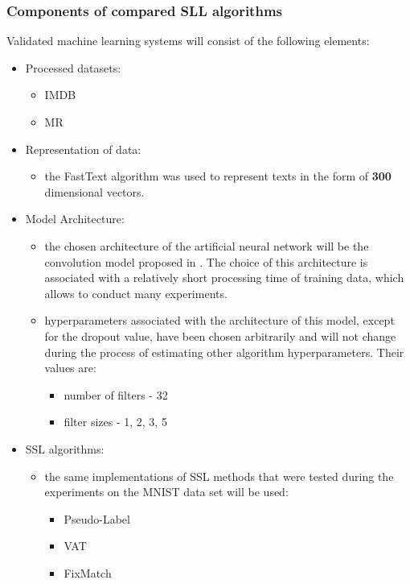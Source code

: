 \documentclass[12pt]{article}
\theoremstyle{definition}
\DeclareRobustCommand{\[}{\begin{equation}}
\DeclareRobustCommand{\]}{\end{equation}}
\begin{document}
\subsubsection{Components of compared SLL algorithms}
Validated machine learning systems will consist of the following elements:
\begin{itemize}
   \item Processed datasets:
   \begin{itemize}
     \item  IMDB \cite{IMDB}
     \item  MR \cite{MR}
   \end{itemize}
   \item Representation of data:
   \begin{itemize}
     \item  the FastText algorithm was used to represent texts in the form of \textbf{300} dimensional vectors.  \cite{FastText}
   \end{itemize}
   \item Model Architecture:
   \begin{itemize}
     \item   the chosen architecture of the artificial neural network will be the convolution model proposed in \cite{Convolution}. The choice of this architecture is associated with a relatively short processing time of training data, which allows to conduct many experiments. 
     \item  hyperparameters associated with the architecture of this model, except for the dropout value, have been chosen arbitrarily and will not change during the process of estimating other algorithm hyperparameters. Their values are:
      \begin{itemize}
      \item number of filters - 32
      \item filter sizes - 1, 2, 3, 5
      \end{itemize}
   \end{itemize}
   \item SSL algorithms:
    \begin{itemize}
    \item the same implementations of SSL methods that were tested during the experiments on the MNIST data set will be used:
        \begin{itemize}
            \item Pseudo-Label
            \item VAT
            \item FixMatch
         \end{itemize}
    \end{itemize}
\end{itemize}
\end{document}
